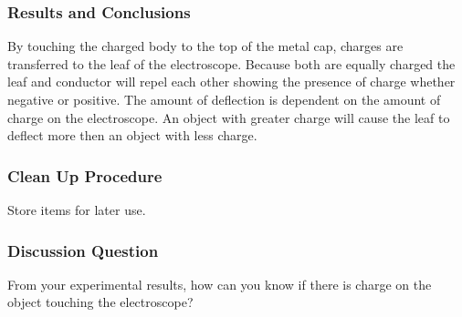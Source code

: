 \subsubsection*{Results and Conclusions}
By touching the charged body to the top of the metal cap, charges are transferred to the leaf of the electroscope. Because both are equally charged the leaf and conductor will repel each other showing the presence of charge whether negative or positive.
The amount of deflection is dependent on the amount of charge on the electroscope. An object with greater charge will cause the leaf to deflect more then an object with less charge. 

\subsubsection*{Clean Up Procedure}
Store items for later use.

\subsubsection*{Discussion Question}
From your experimental results, how can you know if there is charge on the object touching the electroscope?
